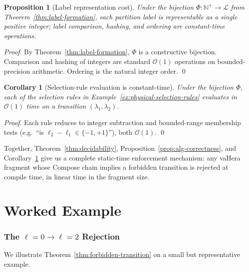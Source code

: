 \documentclass[twocolumn,11pt,a4paper]{article}
\newtheorem{corollary}[theorem]{Corollary}
\newtheorem{proposition}[theorem]{Proposition}
\newcommand{\Natural}{\mathbb{N}}
\newcommand{\Lab}{\mathcal{L}}
\begin{document}
\begin{proposition}[Label representation cost]
\label{prop:label-cost}
Under the bijection $\Phi : \Natural^+ \to \Lab$ from Theorem~\ref{thm:label-formation}, each partition label is representable as a single positive integer; label comparison, hashing, and ordering are constant-time operations.
\end{proposition}

\begin{proof}
By Theorem~\ref{thm:label-formation}, $\Phi$ is a constructive bijection. Comparison and hashing of integers are standard $\mathcal{O}(1)$ operations on bounded-precision arithmetic. Ordering is the natural integer order. \qed
\end{proof}

\begin{corollary}[Selection-rule evaluation is constant-time]
\label{cor:rule-eval-const}
Under the bijection $\Phi$, each of the selection rules in Example~\ref{ex:physical-selection-rules} evaluates in $\mathcal{O}(1)$ time on a transition $(\lambda_1, \lambda_2)$.
\end{corollary}

\begin{proof}
Each rule reduces to integer subtraction and bounded-range membership tests (e.g.\ ``is $\ell_2 - \ell_1 \in \{-1, +1\}$''), both $\mathcal{O}(1)$. \qed
\end{proof}

Together, Theorem~\ref{thm:decidability}, Proposition~\ref{prop:alg-correctness}, and Corollary~\ref{cor:rule-eval-const} give us a complete static-time enforcement mechanism: any vaHera fragment whose Compose chain implies a forbidden transition is rejected at compile time, in linear time in the fragment size.

\part{Worked Example}

\section{The $\ell = 0 \to \ell = 2$ Rejection}
\label{sec:worked-example}

We illustrate Theorem~\ref{thm:forbidden-transition} on a small but representative example.
\end{document}
